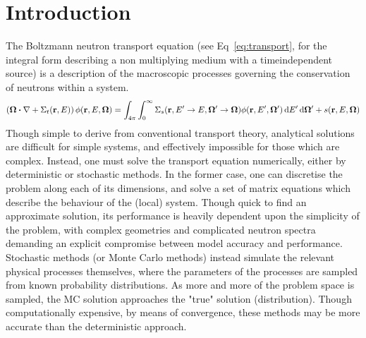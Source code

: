 \documentclass{article}
\begin{document}
\section{Introduction}
The Boltzmann neutron transport equation (see Eq~\ref{eq:transport}, for the integral form describing a non multiplying medium with a time\textendash independent source) is a description of the macroscopic processes governing the conservation of neutrons within a system.
\begin{equation}
  \label{eq:transport}
  \left(\vb{\Omega}\dotproduct\vb{\nabla}+\Sigma_t(\vb{r},E)\right)\phi(\vb{r},E,\vb{\Omega})=\int_{4\pi}{\int_0^\infty{\Sigma_s(\vb{r},E^\prime\rightarrow E,\vb{\Omega^\prime}\rightarrow\vb{\Omega})\phi(\vb{r},E^\prime,\vb{\Omega^\prime})\dd{E^\prime}}\dd{\vb{\Omega^\prime}}}+s(\vb{r},E,\vb{\Omega})
\end{equation}
Though simple to derive from conventional transport theory, analytical solutions are difficult for simple systems, and effectively impossible for those which are complex. Instead, one must solve the transport equation numerically, either by deterministic or stochastic methods. In the former case, one can discretise the problem along each of its dimensions, and solve a set of matrix equations which describe the behaviour of the (local) system. Though quick to find an approximate solution, its performance is heavily dependent upon the simplicity of the problem, with complex geometries and complicated neutron spectra demanding an explicit compromise between model accuracy and performance. Stochastic methods (or Monte Carlo methods) instead simulate the relevant physical processes themselves, where the parameters of the processes are sampled from known probability distributions. As more and more of the problem space is sampled, the MC solution approaches the "true" solution (distribution). Though computationally expensive, by means of convergence, these methods may be more accurate than the deterministic approach.
\end{document}
